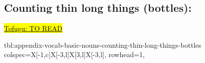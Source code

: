 \documentclass[../nihongo-gakushuu-kyouzai-supplementary.tex]{subfiles}
\begin{document}
\subsection{Counting thin long things (bottles): }
\href{https://www.tofugu.com/japanese/japanese-counter-hon/}{\hl{Tofugu: TO READ}}

{tbl:appendix-vocab-basic-nouns-counting-thin-long-things-bottles}  %
{
    colspec={X[-1,c]X[-3,l]X[3,l]X[-3,l]},
    rowhead=1,
}  %
\end{document}
